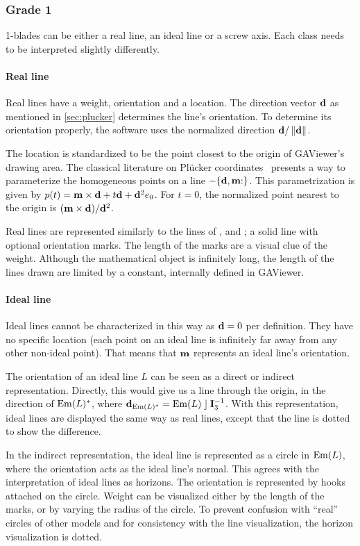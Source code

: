 \subsubsection{Grade 1}
1-blades can be either a real line, an ideal line or a screw axis.  Each class needs to be interpreted slightly differently.

\paragraph{Real line}
Real lines have a weight, orientation and a location.  The direction vector $\mathbf{d}$ as mentioned in \autoref{sec:plucker} determines the line's orientation.  To determine its orientation properly, the software uses the normalized direction $\mathbf{d} / \left\|\mathbf{d}\right\|$.

The location is standardized to be the point closest to the origin of GAViewer's drawing area.  The classical literature on Pl\"ucker coordinates~\cite{Shoemake} presents a way to parameterize the homogeneous points on a line $-\plucker{\V{d}, \V{m}}$.  This parametrization is given by $p(t) = \mathbf{m} \times \mathbf{d} + t \mathbf{d} + \mathbf{d}^2e_0$.  For $t = 0$, the normalized point nearest to the origin is $(\mathbf{m} \times \mathbf{d}) / \mathbf{d}^2$.

Real lines are represented similarly to the lines of \pga{}, \cga{} and \cbga{}; a solid line with optional orientation marks.  The length of the marks are a visual clue of the weight.  Although the mathematical object is infinitely long, the length of the lines drawn are limited by a constant, internally defined in GAViewer.

\paragraph{Ideal line}
Ideal lines cannot be characterized in this way as $\mathbf{d} = 0$ per definition.  They have no specific location (each point on an ideal line is infinitely far away from any other non-ideal point).  That means that $\mathbf{m}$ represents an ideal line's orientation.

The orientation of an ideal line $L$ can be seen as a direct or indirect representation.  Directly, this would give us a line through the origin, in the direction of $\operatorname{Em}(L)^\ast$, where $\mathbf{d}_{\operatorname{Em}(L)^\ast} = \operatorname{Em}(L) \mathbin{\rfloor} \mathbf{I}_3^{-1}$.  With this representation, ideal lines are displayed the same way as real lines, except that the line is dotted to show the difference. 

In the indirect representation, the ideal line is represented as a circle in $\operatorname{Em}(L)$, where the orientation acts as the ideal line's normal.  This agrees with the interpretation of ideal lines as horizons.  The orientation is represented by hooks attached on the circle.  Weight can be visualized either by the length of the marks, or by varying the radius of the circle.  To prevent confusion with ``real'' circles of other models and for consistency with the line visualization, the horizon visualization is dotted.

